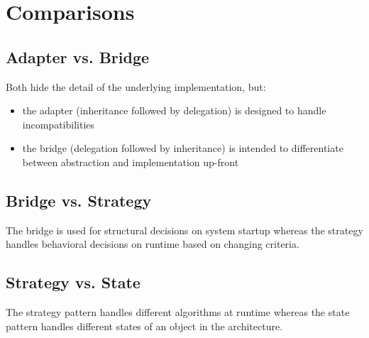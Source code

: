 
\section{Comparisons}

\subsection{Adapter vs. Bridge}
Both hide the detail of the underlying implementation, but:
\begin{itemize}
   \item the adapter (inheritance followed by delegation) is designed to handle incompatibilities
   \item the bridge (delegation followed by inheritance) is intended to differentiate between abstraction and implementation up-front
 \end{itemize}

 \subsection{Bridge vs. Strategy}
 The bridge is used for structural decisions on system startup whereas the strategy handles behavioral decisions on runtime based on changing criteria.

\subsection{Strategy vs. State}
The strategy pattern handles different algorithms at runtime whereas the state pattern handles different states of an object in the architecture.

\newpage

